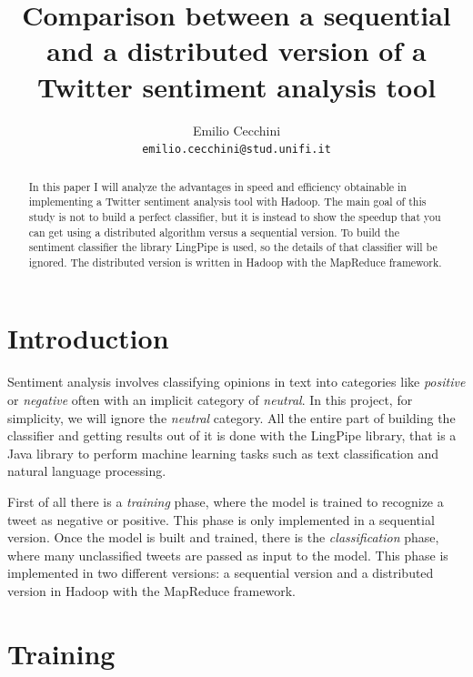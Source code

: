\documentclass[10pt,twocolumn,letterpaper]{article}
\begin{document}
\title{Comparison between a sequential and a distributed version of a Twitter sentiment analysis tool}

\author{
    Emilio Cecchini \\
    {\tt\small emilio.cecchini@stud.unifi.it}
}

\maketitle
\thispagestyle{empty}

\begin{abstract}
In this paper I will analyze the advantages in speed and efficiency obtainable in implementing a Twitter sentiment analysis tool with Hadoop. The main goal of this study is not to build a perfect classifier, but it is instead to show the speedup that you can get using a distributed algorithm versus a sequential version. To build the sentiment classifier the library LingPipe is used, so the details of that classifier will be ignored. The distributed version is written in Hadoop with the MapReduce framework.
\end{abstract}

\section{Introduction}

Sentiment analysis involves classifying opinions in text into categories like \textit{positive} or \textit{negative} often with an implicit category of \textit{neutral}. In this project, for simplicity, we will ignore the \textit{neutral} category. All the entire part of building the classifier and getting results out of it is done with the LingPipe library, that is a Java library to perform machine learning tasks such as text classification and natural language processing.

First of all there is a \textit{training} phase, where the model is trained to recognize a tweet as negative or positive. This phase is only implemented in a sequential version. Once the model is built and trained, there is the \textit{classification} phase, where many unclassified tweets are passed as input to the model. This phase is implemented in two different versions: a sequential version and a distributed version in Hadoop with the MapReduce framework.

\section{Training}
\end{document}
